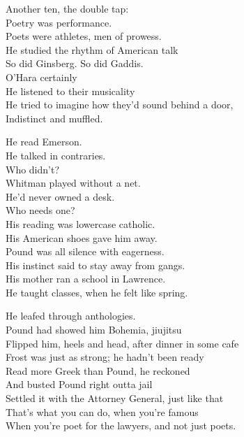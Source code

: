 Another ten, the double tap: \\
Poetry was performance. \\
Poets were athletes, men of prowess. \\
He studied the rhythm of American talk \\
So did Ginsberg. So did Gaddis. \\
O'Hara certainly \\
He listened to their musicality \\
He tried to imagine how they'd sound behind a door, \\
Indistinct and muffled.

He read Emerson. \\
He talked in contraries. \\
Who didn't? \\
Whitman played without a net. \\
He'd never owned a desk. \\
Who needs one? \\

His reading was lowercase catholic. \\
His American shoes gave him away. \\
Pound was all silence with eagerness. \\
His instinct said to stay away from gangs. \\
His mother ran a school in Lawrence. \\
He taught classes, when he felt like spring. 

He leafed through anthologies. \\
Pound had showed him Bohemia, jiujitsu \\
Flipped him, heels and head, after dinner in some cafe \\
Frost was just as strong; he hadn't been ready \\
Read more Greek than Pound, he reckoned \\
And busted Pound right outta jail \\
Settled it with the Attorney General, just like that \\
That's what you can do, when you're famous \\
When you're poet for the lawyers, and not just poets.

